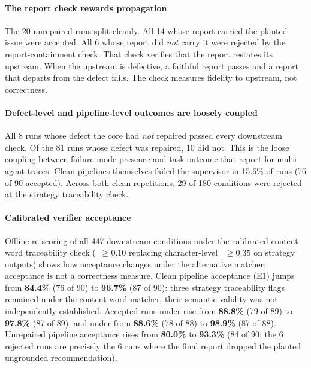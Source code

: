 \paragraph{The report check rewards propagation}
The 20 unrepaired  runs split cleanly. All 14 whose report carried the
planted issue were accepted. All 6 whose report did \emph{not} carry it were
rejected by the report-containment check. That check verifies that the report
restates its upstream. When the upstream is defective, a faithful report
passes and a report that departs from the defect fails. The check measures
fidelity to upstream, not correctness.

\paragraph{Defect-level and pipeline-level outcomes are loosely coupled}
All 8  runs whose defect the core had \emph{not} repaired passed every
downstream check. Of the 81 runs whose defect was repaired, 10 did not. This is
the loose coupling between failure-mode presence and task outcome that
\citet{cemri2025mast} report for multi-agent traces. Clean pipelines themselves
failed the supervisor in 15.6\% of runs (76 of 90 accepted). Across both clean repetitions, 29 of 180 conditions were rejected at the strategy traceability check.

\paragraph{Calibrated verifier acceptance}
Offline re-scoring of all 447 downstream conditions under the calibrated
content-word traceability check (~$\ge 0.10$ replacing character-level
~$\ge 0.35$ on strategy outputs) shows how acceptance changes under the alternative matcher; acceptance is not a correctness measure. Clean pipeline acceptance (E1) jumps from
\textbf{84.4\%} (76 of 90) to \textbf{96.7\%} (87 of 90): three strategy traceability flags remained under the content-word matcher; their semantic validity was not independently established.
Accepted runs under  rise from \textbf{88.8\%} (79 of 89) to
\textbf{97.8\%} (87 of 89), and under  from \textbf{88.6\%} (78 of 88)
to \textbf{98.9\%} (87 of 88). Unrepaired pipeline acceptance rises from
\textbf{80.0\%} to \textbf{93.3\%} (84 of 90; the 6 rejected runs are precisely
the 6  runs where the final report dropped the planted ungrounded recommendation).

